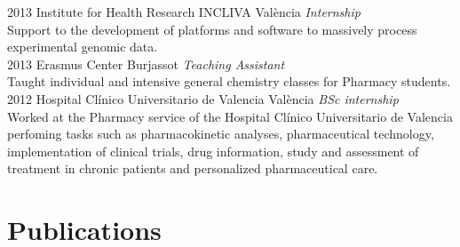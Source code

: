 \documentclass[]{friggeri-cv} %
\begin{document}
\begin{entrylist}
\entry
{2013}
{Institute for Health Research INCLIVA}
{València}
{\emph {Internship} \\
Support to the development of platforms and software to massively process experimental genomic data. \\
}
\entry
{2013}
{Erasmus Center}
{Burjassot}
{\emph {Teaching Assistant} \\
Taught individual and intensive general chemistry classes for Pharmacy students.\\
}
\entry
{2012}
{Hospital Clínico Universitario de Valencia}
{València}
{\emph {BSc internship} \\
Worked at the Pharmacy service of the Hospital Clínico Universitario de Valencia perfoming tasks such as pharmacokinetic analyses, pharmaceutical technology, implementation of clinical trials, drug information, study and assessment of treatment in chronic patients and personalized pharmaceutical care. \\
}
\end{entrylist}



\section{Publications}
\end{document}
